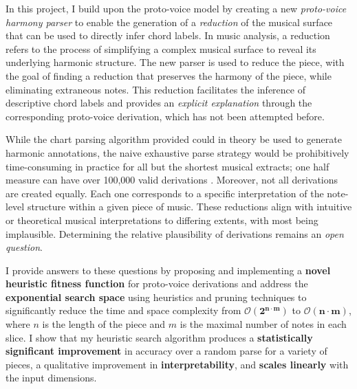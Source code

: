 \documentclass[12pt,a4paper,twoside,openany]{report} \usepackage[pdfborder={0 0 0}]{hyperref}    %
\theoremstyle{definition} \newtheorem{definition}{Definition}[section]
\begin{document}
    In this project, I build upon the proto-voice model by creating a new \textit{proto-voice harmony parser} to enable the generation of a \textit{reduction} of the musical
    surface that can be used to directly infer chord labels. In music analysis, a reduction refers to the process
    of simplifying a complex musical surface to reveal its underlying harmonic structure. 
    The new parser is used to reduce the piece, with the goal of finding a reduction that preserves the harmony of
    the piece, while eliminating extraneous notes. This reduction facilitates the inference of descriptive chord labels and provides an
    \textit{explicit explanation} through the corresponding proto-voice derivation, which has not been attempted before. 

    While the chart parsing algorithm provided \cite{finkensiepProtovoicesModelTonal2021} could in theory be used to
    generate harmonic annotations, the naive exhaustive parse strategy would be prohibitively time-consuming in
    practice for all but the shortest musical extracts; one half measure can have over 100,000 valid derivations
    \cite{finkensiepStructureFreePolyphony2023}. Moreover, not all derivations are created equally. Each one
    corresponds to a specific interpretation of the note-level structure within a given piece of music. These
    reductions align with intuitive or theoretical musical interpretations to differing extents, with most being implausible. 
    Determining the relative plausibility of derivations remains an \textit{open question}. 

    I provide answers to these questions by proposing and implementing a \textbf{novel heuristic fitness function} for
    proto-voice derivations and address the \textbf{exponential search space} using heuristics and pruning
    techniques to significantly reduce the time and space complexity from $\bm{\mathcal{O}(2^{n \cdot m})}$
      to $\bm{\mathcal{O}(n \cdot m)}$, where $n$ is the length of the piece and $m$ is the maximal number of notes in each
      slice. I show that my heuristic search algorithm produces a \textbf{statistically significant improvement} in accuracy
      over a random parse for a variety of pieces, a qualitative improvement in \textbf{interpretability}, and
      \textbf{scales linearly} with the input dimensions.
\end{document}
